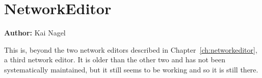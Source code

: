\chapter{NetworkEditor}
\label{sec:contrib-networkEditor}

\hfill \textbf{Author:} Kai Nagel



This is, beyond the two network editors described in Chapter~\ref{ch:networkeditor}, a third network editor. 
It is older than the other two and has not been systematically maintained, but it still seems to be working and so it is still there.

